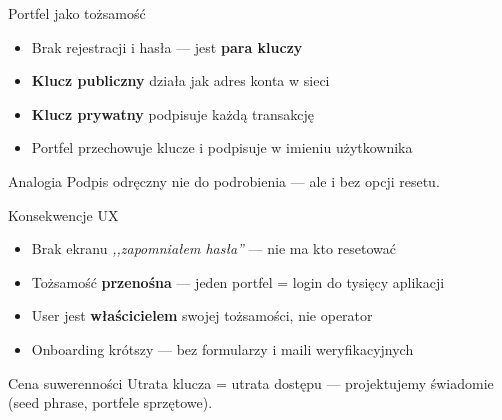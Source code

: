 \begin{frame}{Portfel jako tożsamość}
  \begin{itemize}
    \item Brak rejestracji i hasła --- jest \textbf{para kluczy}
    \item \textbf{Klucz publiczny} działa jak adres konta w sieci
    \item \textbf{Klucz prywatny} podpisuje każdą transakcję
    \item Portfel przechowuje klucze i podpisuje w imieniu użytkownika
  \end{itemize}
  \vspace{0.3cm}
  \begin{exampleblock}{Analogia}
    Podpis odręczny nie do podrobienia --- ale i bez opcji resetu.
  \end{exampleblock}
\end{frame}

\begin{frame}{Konsekwencje UX}
  \begin{itemize}
    \item Brak ekranu \textit{,,zapomniałem hasła''} --- nie ma kto resetować
    \item Tożsamość \textbf{przenośna} --- jeden portfel = login do tysięcy aplikacji
    \item User jest \textbf{właścicielem} swojej tożsamości, nie operator
    \item Onboarding krótszy --- bez formularzy i maili weryfikacyjnych
  \end{itemize}
  \vspace{0.3cm}
  \begin{alertblock}{Cena suwerenności}
    Utrata klucza = utrata dostępu --- projektujemy świadomie
    (seed phrase, portfele sprzętowe).
  \end{alertblock}
\end{frame}

